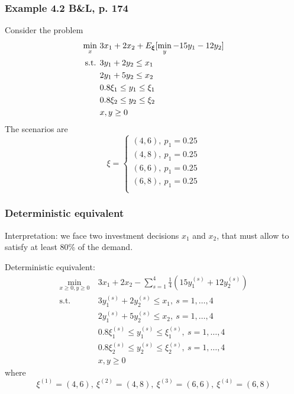 \documentclass{beamer}
\begin{document}
\begin{frame}
\frametitle{Example 4.2 B\&L, p. 174}

Consider the problem
\begin{align*}
	\min_x\ & 3x_1 + 2x_2 + E_{{\boldsymbol{\xi}}}[\min_y -15y_1-12y_2] \\
	\mbox{s.t. } & 3y_1 + 2y_2 \leq x_1 \\
	& 2y_1 + 5y_2 \leq x_2 \\
	& 0.8 \xi_1 \leq y_1 \leq \xi_1 \\
	& 0.8 \xi_2 \leq y_2 \leq \xi_2 \\
	& x, y \geq 0
\end{align*}
The scenarios are
\[
\xi =
\begin{cases}
(4,6),\ p_1 = 0.25 \\
(4,8),\ p_1 = 0.25 \\
(6,6),\ p_1 = 0.25 \\
(6,8),\ p_1 = 0.25 \\
\end{cases}
\]

\end{frame}

\begin{frame}
\frametitle{Deterministic equivalent}

{\red Interpretation}: we face two investment decisions $x_1$ and $x_2$,
that must allow to satisfy at least 80\% of the demand.

{\red Deterministic equivalent}:
\begin{align*}
\min_{x \geq 0, y \geq 0}\ & 3x_1 + 2x_2 - \sum_{s = 1}^4 \frac{1}{4} \left( 15y^{(s)}_1+12y^{(s)}_2 \right) \\
\mbox{s.t. } & 3y^{(s)}_1 + 2y^{(s)}_2 \leq x_1,\ s = 1,\ldots,4 \\
& 2y^{(s)}_1 + 5y^{(s)}_2 \leq x_2,\ s = 1,\ldots,4 \\
& 0.8 \xi^{(s)}_1 \leq y^{(s)}_1 \leq \xi^{(s)}_1,\ s = 1,\ldots,4 \\
& 0.8 \xi^{(s)}_2 \leq y^{(s)}_2 \leq \xi^{(s)}_2,\ s = 1,\ldots,4 \\
& x, y \geq 0
\end{align*}
where
$$
\xi^{(1)} = (4,6),\ 
\xi^{(2)} = (4,8), \
\xi^{(3)} = (6,6),\ 
\xi^{(4)} = (6,8)
$$

\end{frame}
\end{document}
